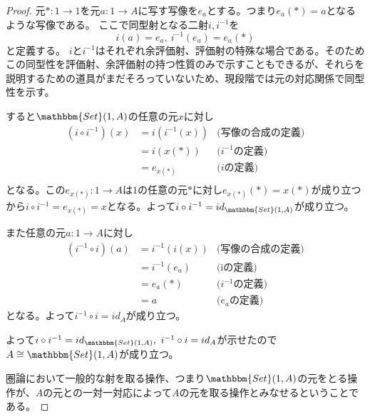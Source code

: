 \documentclass[dvipdfmx]{jsarticle}
\newcommand{\cat}[1]{\mathbbm{#1}}
\newcommand{\arrow}{\rightarrow}
\newcommand{\mor}[3]{#1:#2\arrow #3}
\newcommand{\arset}[3]{\cat{#1}(#2,#3)}
\newtheorem{proof}{証明}[section]
\numberwithin{proof}{subsection}
\numberwithin{prop}{subsection}
\numberwithin{define}{subsection}
\begin{document}
	\begin{proof}
		元$\mor{*}{1}{1}$を元$\mor{a}{1}{A}$に写す写像を$e_a$とする。つまり$e_a(*)=a$となるような写像である。
		ここで同型射となる二射$i,i^{-1}$を\[i(a)=e_a,\ i^{-1}(e_a)=e_a(*)\]と定義する。
		$i$と$i^{-1}$はそれぞれ余評価射、評価射の特殊な場合である。そのためこの同型性を評価射、余評価射の持つ性質のみで示すこともできるが、それらを説明するための道具がまだそろっていないため、現段階では元の対応関係で同型性を示す。
		\begin{center}
		\end{center}
		すると$\arset{Set}{1}{A}$の任意の元$x$に対し
			\begin{align*}
				(i\circ i^{-1})(x)&=i(i^{-1}(x))&\text{(写像の合成の定義)}\\
				&=i(x(*))&\text{($i^{-1}$の定義)}\\
				&=e_{x(*)}&\text{($i$の定義)}\\
			\end{align*}
		となる。この$\mor{e_{x(*)}}{1}{A}$は$1$の任意の元$*$に対し$e_{x(*)}(*)=x(*)$が成り立つから$i\circ i^{-1}=e_{x(*)}=x$となる。よって$i\circ i^{-1}=id_{\arset{Set}{1}{A}}$が成り立つ。

		また任意の元$\mor{a}{1}{A}$に対し
		\begin{align*}
			(i^{-1}\circ i)(a)&=i^{-1}(i(x))&\text{(写像の合成の定義)}\\
			&=i^{-1}(e_a)&\text{(iの定義)}\\
			&=e_a(*)&\text{($i^{-1}$の定義)}\\
			&=a&\text{($e_a$の定義)}
		\end{align*}
		となる。よって$i^{-1}\circ i=id_A$が成り立つ。

		よって$i\circ i^{-1}=id_{\arset{Set}{1}{A}},\ i^{-1}\circ i=id_A$が示せたので$A\cong\arset{Set}{1}{A}$が成り立つ。

		圏論において一般的な射を取る操作、つまり$\arset{Set}{1}{A}$の元をとる操作が、$A$の元との一対一対応によって$A$の元を取る操作とみなせるということである。

	\end{proof}
\end{document}
